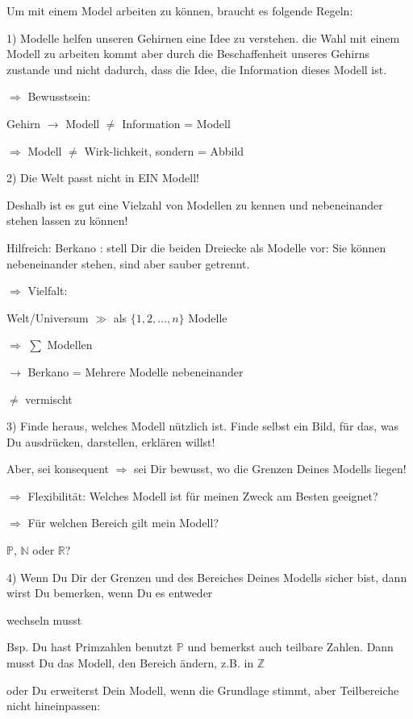\documentclass[11pt,titlepage,a5paper]{book}
\begin{document}
Um mit einem Model arbeiten zu können, braucht es folgende Regeln:

1) Modelle helfen unseren Gehirnen eine Idee zu verstehen. die Wahl mit einem Modell zu arbeiten kommt aber durch die Beschaffenheit unseres Gehirns zustande und nicht dadurch, dass die Idee, die Information dieses Modell ist.

$\Rightarrow$ Bewusstsein:

Gehirn $\rightarrow$ Modell
$\neq$ Information = Modell

$\Rightarrow$ Modell $\neq$ Wirk-lichkeit, sondern = Abbild 

2) Die Welt passt nicht in EIN Modell!

Deshalb ist es gut eine Vielzahl von Modellen zu kennen und nebeneinander stehen lassen zu können!

Hilfreich: Berkano : stell Dir die beiden Dreiecke als Modelle vor: Sie können nebeneinander stehen, sind aber sauber getrennt. 

$\Rightarrow$ Vielfalt:

Welt/Universum $\gg$ als $\{1,2,\dots,n \}$ Modelle

$\Rightarrow$ $\sum$ Modellen

$\to$ Berkano  = Mehrere Modelle nebeneinander

$\neq$ vermischt

3) Finde heraus, welches Modell nützlich ist. Finde selbst ein Bild, für das, was Du ausdrücken, darstellen, erklären willst!

Aber, sei konsequent $\Rightarrow$ sei Dir bewusst, wo die Grenzen Deines Modells liegen! 

$\Rightarrow$ Flexibilität: Welches Modell ist für meinen Zweck am Besten geeignet? 

$\Rightarrow$ Für welchen Bereich gilt mein Modell?


$\mathbb{P}$, $\mathbb{N}$ oder $\mathbb{R}$?


4) Wenn Du Dir der Grenzen und des Bereiches Deines Modells sicher bist, dann wirst Du bemerken, wenn Du es entweder

wechseln musst

Bsp. Du hast Primzahlen benutzt $\mathbb{P}$ und bemerkst auch teilbare Zahlen. Dann musst Du das Modell, den Bereich ändern, z.B. in $\mathbb{Z}$


oder Du erweiterst Dein Modell, wenn die Grundlage stimmt, aber Teilbereiche nicht hineinpassen:
\end{document}
